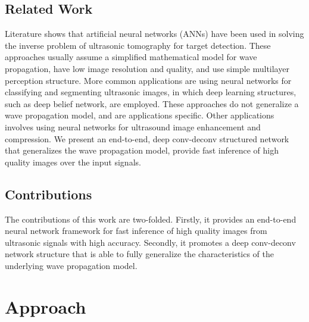 \documentclass{article}
\begin{document}

\subsection{Related Work}
\label{sub:related_work}

Literature shows that artificial neural networks (ANNs) have been used in solving the inverse problem of ultrasonic tomography for target detection\cite{anthony1992ultrasound,pardoe1997neural}. These approaches usually assume a simplified mathematical model for wave propagation, have low image resolution and quality, and use simple multilayer perception structure. More common applications are using neural networks for classifying and segmenting ultrasonic images\cite{dokur2002segmentation,sujana1996application,prater1992segmenting,feleppa2002ultrasonic}, in which deep learning structures, such as deep belief network\cite{carneiro2012segmentation}, are employed. These approaches do not generalize a wave propagation model, and are applications specific. Other applications involves using neural networks for ultrasound image enhancement and compression\cite{miller1992review}. We present an end-to-end, deep conv-deconv structured network that generalizes the wave propagation model, provide fast inference of high quality images over the input signals.

\subsection{Contributions}
\label{sub:contribution}
The contributions of this work are two-folded. Firstly, it provides an end-to-end neural network framework for fast inference of high quality images from ultrasonic signals with high accuracy. Secondly, it promotes a deep conv-deconv network structure that is able to fully generalize the characteristics of the underlying wave propagation model.

\section{Approach}
\label{sec:approach}
\end{document}

